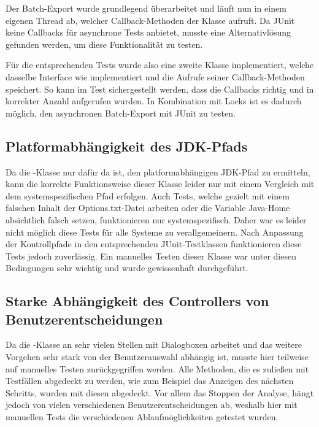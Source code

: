 Der Batch-Export wurde grundlegend überarbeitet und läuft nun in einem eigenen Thread ab, welcher Callback-Methoden der Klasse  aufruft.
Da JUnit keine Callbacks für asynchrone Tests anbietet, musste eine Alternativlösung gefunden werden, um diese Funktionalität zu testen.

Für die entsprechenden Tests wurde also eine zweite Klasse implementiert, welche dasselbe Interface wie  implementiert und die Aufrufe seiner Callback-Methoden speichert.
So kann im Test sichergestellt werden, dass die Callbacks richtig und in korrekter Anzahl aufgerufen wurden.
In Kombination mit Locks ist es dadurch möglich, den asynchronen Batch-Export mit JUnit zu testen.

\subsection{Platformabhängigkeit des JDK-Pfads}

Da die -Klasse nur dafür da ist, den platformabhängigen JDK-Pfad zu ermitteln, kann die korrekte Funktionsweise dieser Klasse leider nur mit einem Vergleich mit dem systemspezifischen Pfad erfolgen. Auch Tests, welche gezielt mit einem falschen Inhalt der Options.txt-Datei arbeiten oder die Variable Java-Home absichtlich falsch setzen, funktionieren nur systemspezifisch. Daher war es leider nicht möglich diese Tests für alle Systeme zu verallgemeinern. Nach Anpassung der Kontrollpfade in den entsprechenden JUnit-Testklassen funktionieren diese Tests jedoch zuverlässig. Ein manuelles Testen dieser Klasse war unter diesen Bedingungen sehr wichtig und wurde gewissenhaft durchgeführt.

\subsection{Starke Abhängigkeit des Controllers von Benutzerentscheidungen}

Da die -Klasse an sehr vielen Stellen mit Dialogboxen arbeitet und das weitere Vorgehen sehr stark von der Benutzerauswahl abhängig ist, musste hier teilweise auf manuelles Testen zurückgegriffen werden. Alle Methoden, die es zuließen mit Testfällen abgedeckt zu werden, wie zum Beispiel das Anzeigen des nächsten Schritts, wurden mit diesen abgedeckt. Vor allem das Stoppen der Analyse, hängt jedoch von vielen verschiedenen Benutzerentscheidungen ab, weshalb hier mit manuellen Tests die verschiedenen Ablaufmöglichkeiten getestet wurden.
